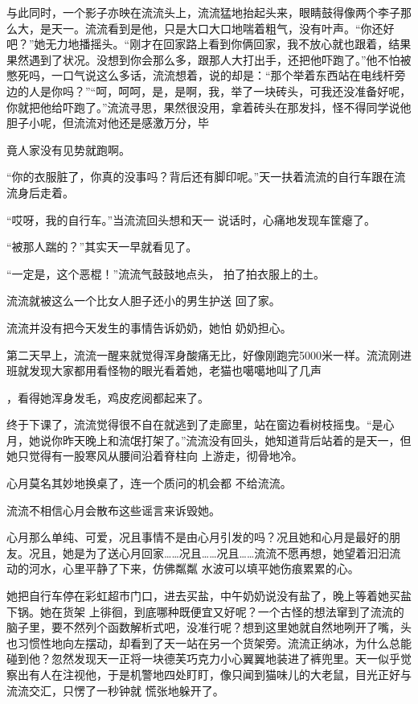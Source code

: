 \documentclass{article}
\begin{document}
与此同时，一个影子亦映在流流头上，流流猛地抬起头来，眼睛鼓得像两个李子那么大，是天一。流流看到是他，只是大口大口地喘着粗气，没有叶声。“你还好吧？”她无力地播摇头。“刚才在回家路上看到你俩回家，我不放心就也跟着，结果果然遇到了状况。没想到你会那么多，跟那人大打出手，还把他吓跑了。”他不怕被憋死吗，一口气说这么多话，流流想着，说的却是：“那个举着东西站在电线杆旁边的人是你吗？”“呵，呵呵，是，是啊，我，举了一块砖头，可我还没准备好呢，你就把他给吓跑了。”流流寻思，果然很没用，拿着砖头在那发抖，怪不得同学说他胆子小呢，但流流对他还是感激万分，毕

\newpage
竟人家没有见势就跑啊。 

“你的衣服脏了，你真的没事吗？背后还有脚印呢。”天一扶着流流的自行车跟在流流身后走着。

“哎呀，我的自行车。”当流流回头想和天一
说话时，心痛地发现车筐瘪了。 


“被那人踹的？”其实天一早就看见了。 

“一定是，这个恶棍！”流流气鼓鼓地点头，
拍了拍衣服上的土。 

流流就被这么一个比女人胆子还小的男生护送
回了家。 

流流并没有把今天发生的事情告诉奶奶，她怕
奶奶担心。 

第二天早上，流流一醒来就觉得浑身酸痛无比，好像刚跑完5000米一样。流流刚进班就发现大家都用看怪物的眼光看着她，老猫也噶噶地叫了几声
\newpage

，看得她浑身发毛，鸡皮疙阅都起来了。 

终于下课了，流流觉得很不自在就逃到了走廊里，站在窗边看树枝摇曳。“是心月，她说你昨天晚上和流氓打架了。”流流没有回头，她知道背后站着的是天一，但她只觉得有一股寒风从腰间沿着脊柱向
上游走，彻骨地冷。 

心月莫名其妙地换桌了，连一个质问的机会都
不给流流。 


流流不相信心月会散布这些谣言来诉毁她。 

心月那么单纯、可爱，况且事情不是由心月引发的吗？况且她和心月是最好的朋友。况且，她是为了送心月回家……况且……况且……流流不愿再想，她望着汩汩流动的河水，心里平静了下来，仿佛粼粼
水波可以填平她伤痕累累的心。 

她把自行车停在彩虹超市门口，进去买盐，中午奶奶说没有盐了，晚上等着她买盐下锅。她在货架
\newpage
上徘徊，到底哪种既便宜又好呢？一个古怪的想法窜到了流流的脑子里，要不然列个函数解析式吧，没准行呢？想到这里她就自然地咧开了嘴，头也习惯性地向左摆动，却看到了天一站在另一个货架旁。流流正纳冰，为什么总能碰到他？忽然发现天一正将一块德芙巧克力小心翼翼地装进了裤兜里。天一似乎觉察出有人在注视他，于是机警地四处盯盯，像只闻到猫味儿的大老鼠，目光正好与流流交汇，只愣了一秒钟就
慌张地躲开了。 
\end{document}
